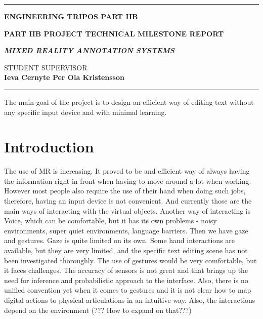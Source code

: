 \documentclass[a4paper, 12pt]{article}
\begin{document}

\noindent
\rule{\textwidth}{0.5mm}
\begin{center}
{\bf ENGINEERING TRIPOS PART IIB}
\end{center}
\vspace{0.5cm} {\bf PART IIB PROJECT \hfill TECHNICAL MILESTONE REPORT}
\vspace{0.5cm}
\begin{center}
{\bf \LARGE \textit{MIXED REALITY ANNOTATION SYSTEMS} \\}
\end{center}
STUDENT \hfill SUPERVISOR \\
{\bf Ieva Cernyte \hfill Per Ola Kristensson \\}
\rule{\textwidth}{0.5mm}
\vspace{0.5cm}



The main goal of the project is to design an efficient way of editing text without any specific input device and with minimal learning. 


\section{Introduction}

The use of MR is increasing. It proved to be and efficient way of always having the information right in front when having to move around a lot when working. However most people also require the use of their hand when doing such jobs, therefore,  having an input device is not convenient. And currently those are the main ways of interacting with the virtual objects. Another way of interacting is Voice, which can be comfortable, but it has its own problems - noisy environments, super quiet environments, language barriers. Then we have gaze and gestures. Gaze is quite limited on its own. Some hand interactions are available, but they are very limited, and the specific text editing scene has not been investigated thoroughly. The use of gestures would be very comfortable, but it faces challenges. The accuracy of sensors is not great and that brings up the need for inference and probabilistic approach to the interface. Also, there is no unified convention yet when it comes to gestures and it is not clear how to map digital actions to physical articulations in an intuitive way. Also, the interactions depend on the environment (??? How to expand on that???)
\end{document}
